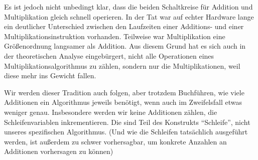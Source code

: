 \begin{remark}
    Es ist jedoch nicht unbedingt klar, dass die beiden Schaltkreise für Addition und Multiplikation gleich schnell operieren. In der Tat war auf echter Hardware lange ein deutlicher Unterschied zwischen den Laufzeiten einer Additions- und einer Multiplikationsinstruktion vorhanden. Teilweise war Multiplikation eine Größenordnung langsamer als Addition. Aus diesem Grund hat es sich auch in der theoretischen Analyse eingebürgert, nicht alle Operationen eines Multiplikationsalgorithmus zu zählen, sondern nur die Multiplikationen, weil diese mehr ins Gewicht fallen.
    
    \smallskip
    Wir werden dieser Tradition auch folgen, aber trotzdem Buchführen, wie viele Additionen ein Algorithmus jeweils benötigt, wenn auch im Zweifelsfall etwas weniger genau. Insbesondere werden wir keine Additionen zählen, die Schleifenvariablen inkrementieren. Die sind Teil des Konstrukts \enquote{Schleife}, nicht unseres spezifischen Algorithmus. (Und wie die Schleifen tatsächlich ausgeführt werden, ist außerdem zu schwer vorhersagbar, um konkrete Anzahlen an Additionen vorhersagen zu können)
\end{remark}

